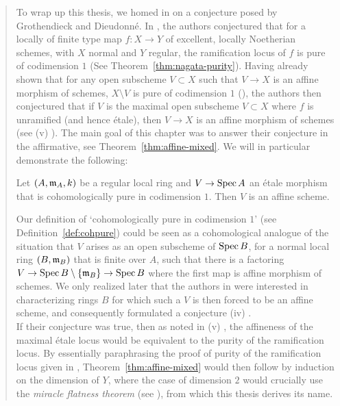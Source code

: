 \begin{abstract}
To wrap up this thesis, we homed in on a conjecture posed by Grothendieck and Dieudonné. In \cite[21.12.14]{EGAIV}, 
the authors conjectured that for a locally of finite type map $f: X \to Y$ of excellent, locally Noetherian schemes, with $X$ normal and $Y$ regular, the 
ramification locus of $f$ is pure of codimension $1$ (See Theorem~\ref{thm:nagata-purity}). Having already shown that for any open subscheme $V \subset X$ such that $V \to X$ is an affine morphism of schemes,
 $X \setminus V$ is pure of codimension $1$ (\cite[21.12.7]{EGAIV}), the authors then conjectured that
if $V$ is the maximal open subscheme $V \subset X$ where $f$ is unramified (and hence \'{e}tale), then $V \to X$ is an affine morphism of schemes (see (v) \cite[21.12.14]{EGAIV}).
The main goal of this chapter was to answer their conjecture in the affirmative, see Theorem~\ref{thm:affine-mixed}. We will in particular demonstrate the following:
\begin{theorem}
Let $(A,\ideal{m}_A,k)$ be a regular local ring and $V \to \spec{A}$ an \'{e}tale morphism that is cohomologically pure in codimension $1$. Then $V$ is an affine scheme.
\end{theorem}
Our definition of `cohomologically pure in codimension $1$' (see Definition~\ref{def:cohpure}) could be seen as a cohomological analogue of the situation that $V$ arises 
as an open subscheme of $\spec{B}$, for a normal local ring $(B, \ideal{m}_B)$ that is finite over $A$, such that there is a factoring
$ V\to \spec{B} \setminus \{\ideal{m}_B\} \to \spec{B}$ where the first map is affine morphism of schemes. We only realized later that the authors in \cite[21.12]{EGAIV} were interested in characterizing rings $B$ for which such a $V$ is then 
forced to be an affine scheme, and consequently formulated a conjecture (iv) \cite[21.12.14]{EGAIV}.\\
\indent If their conjecture was true, 
then as noted in (v) \cite[21.12.14]{EGAIV}, the affineness of the maximal \'{e}tale locus would be equivalent to the purity of the ramification locus. 
By essentially paraphrasing the proof of purity of the ramification locus given in \cite[0ECD]{sp}, 
Theorem~\ref{thm:affine-mixed} would then follow by induction on the dimension of $Y$, where the case of dimension $2$ would crucially use 
the \textit{miracle flatness theorem} (see \cite[00R4]{sp}), from which this thesis derives its name.
\end{abstract}
\thispagestyle{empty}